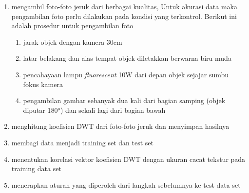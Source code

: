 \documentclass[laporan.tex]{subfiles}
\begin{document}
\begin{enumerate}
\item mengambil foto-foto jeruk dari berbagai kualitas, Untuk akurasi data maka pengambilan foto perlu dilakukan pada kondisi yang terkontrol. Berikut ini adalah prosedur untuk pengambilan foto
\begin{enumerate}
\item jarak objek dengan kamera 30cm
\item latar belakang dan alas tempat objek diletakkan berwarna biru muda
\item pencahayaan lampu \emph{fluorescent} 10W dari depan objek sejajar sumbu fokus kamera
\item pengambilan gambar sebanyak dua kali dari bagian samping (objek diputar 180$^o$) dan sekali lagi dari bagian bawah
\end{enumerate}
\item menghitung koefisien DWT dari foto-foto jeruk dan menyimpan hasilnya
\item membagi data menjadi training set dan test set
\item menentukan korelasi vektor koefisien DWT dengan ukuran cacat tekstur pada training data set
\item menerapkan aturan yang diperoleh dari langkah sebelumnya ke test data set
\end{enumerate}
\end{document}
